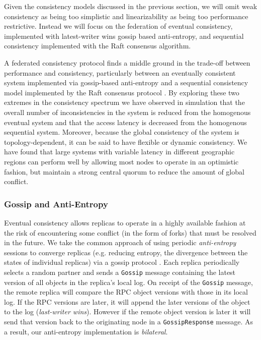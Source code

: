 \documentclass{article}
\begin{document}
Given the consistency models discussed in the previous section, we will omit weak consistency as being too simplistic and linearizability as being too performance restrictive. Instead we will focus on the federation of eventual consistency, implemented with latest-writer wins gossip based anti-entropy, and sequential consistency implemented with the Raft consensus algorithm.

A federated consistency protocol finds a middle ground in the trade-off between performance and consistency, particularly between an eventually consistent system implemented via gossip-based anti-entropy \cite{kempe_gossip-based_2003} and a sequential consistency model implemented by the Raft consensus protocol \cite{ongaro_search_2014}. By exploring these two extremes in the consistency spectrum we have observed in simulation that the overall number of inconsistencies in the system is reduced from the homogenous eventual system and that the access latency is decreased from the homogenous sequential system. Moreover, because the global consistency of the system is topology-dependent, it can be said to have flexible or dynamic consistency. We have found that large systems with variable latency in different geographic regions can perform well by allowing most nodes to operate in an optimistic fashion, but maintain a strong central quorum to reduce the amount of global conflict.

\subsubsection{Gossip and Anti-Entropy}
\label{sec:gossip}

Eventual consistency allows replicas to operate in a highly available fashion at the risk of encountering some conflict (in the form of forks) that must be resolved in the future. We take the common approach of using periodic \textit{anti-entropy} sessions to converge replicas (e.g. reducing entropy, the divergence between the states of individual replicas) via a gossip protocol \cite{kempe_gossip-based_2003}. Each replica periodically selects a random partner and sends a \texttt{Gossip} message containing the latest version of all objects in the replica's local log. On receipt of the \texttt{Gossip} message, the remote replica will compare the RPC object versions with those in its local log. If the RPC versions are later, it will append the later versions of the object to the log (\textit{last-writer wins}). However if the remote object version is later it will send that version back to the originating node in a \texttt{GossipResponse} message. As a result, our anti-entropy implementation is \textit{bilateral}.
\end{document}
